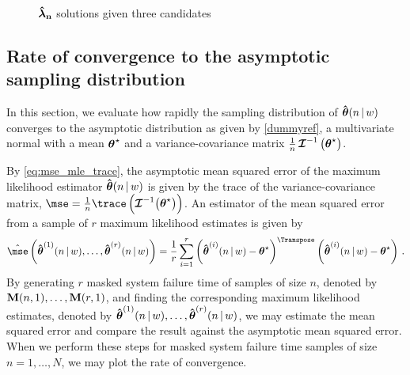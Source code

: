 \documentclass[
    11pt,
    extrafontsizes,
    article,
    oldfontcommands,
    final,
    oneside,
    openany,
    hidelinks]{memoir}
\begin{document}
\begin{figure}
\caption{$\expomle$ solutions given three candidates}
\label{fig:plane_sol}
\centering
{}
\end{figure}

\subsection{Rate of convergence to the asymptotic sampling distribution}
In this section, we evaluate how rapidly the sampling distribution of $\mle$ 
converges to the asymptotic distribution as given by \cref{dummyref}, a 
multivariate normal with a mean $\tparam\sysparamvec$ and a variance-covariance 
matrix $\frac{1}{n} \infomatrx^{-1}\left(\tparam\sysparamvec\right)$.

By \cref{eq:mse_mle_trace}, the asymptotic mean squared error of the maximum likelihood estimator $\mle$ is given by the trace of the variance-covariance matrix, $\mse = \frac{1}{n} \trace \left ( \infomatrx^{-1} \bigl(\tparam\sysparamvec\bigr) \right)$. An estimator of the mean squared error from a sample of $r$ maximum likelihood estimates is given by
\begin{equation}
\estimator{\mse}\left(\mlei{1}, \ldots, \mlei{r}\right) = \frac{1}{r} 
\sum_{i=1}^{r} \left( \mlei{i} - \tparam\sysparamvec \right)^\Transpose \left( 
\mlei{i} - \tparam\sysparamvec \right)\,.
\end{equation}
By generating $r$ masked system failure time of samples of size $n$, denoted by $\mfswn{1}{n}, \ldots, \mfswn{1}{r}$, and finding the corresponding maximum likelihood estimates, denoted by $\mlei{1}, \ldots, \mlei{r}$, we may estimate the mean squared error and compare the result against the asymptotic mean squared error. When we perform these steps for masked system failure time samples of size $n = 1,\ldots, N$, we may plot the rate of convergence.
\end{document}
